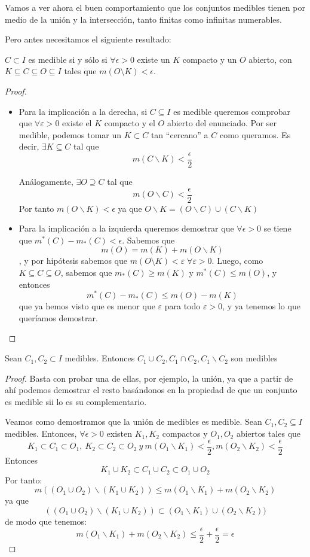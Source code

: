 \documentclass{apuntes}
\begin{document}
Vamos a ver ahora el buen comportamiento que los conjuntos medibles tienen por medio de la unión y la intersección, tanto finitas como infinitas numerables.

Pero antes necesitamos el siguiente resultado:
\begin{prop} $C \subset I$ es medible si y sólo si $\forall \epsilon > 0$ existe un $K$ compacto y un $O$ abierto, con $K⊆C⊆O⊆I$ tales que $m(O\setminus K) < \epsilon$.
\end{prop}

\begin{proof}
\begin{itemize}
\item Para la implicación a la derecha, si $C⊆I$ es medible queremos comprobar que $∀ε>0$ existe el $K$ compacto y el $O$ abierto del enunciado. Por ser medible, podemos tomar un $K \subset C$ tan ``cercano'' a $C$ como queramos. Es decir, $∃K⊆C$ tal que \[ m(C\smallsetminus K ) < \frac{\epsilon}{2}\]

Análogamente, $\exists O ⊇ C$ tal que \[ m(O\smallsetminus C ) < \frac{\epsilon}{2} \]
Por tanto $m(O\smallsetminus K) < \epsilon$ ya que $O \smallsetminus K = (O \smallsetminus C) \cup (C \smallsetminus K)$

\item Para la implicación a la izquierda queremos demostrar que $\forall \epsilon > 0$ se tiene que $m^*(C)-m_*(C) < \epsilon$. Sabemos que \[ m(O)=m(K) + m(O\smallsetminus K) \], y por hipótesis sabemos que $m(O\setminus K) < ε\; ∀ε>0$. Luego, como $K⊆C⊆O$, sabemos que $m_*(C) ≥ m(K)$ y $m^*(C) ≤ m(O)$, y entonces \[ m^*(C) - m_*(C) ≤ m(O) - m(K)\] que ya hemos visto que es menor que $ε$ para todo $ε>0$, y ya tenemos lo que queríamos demostrar.
\end{itemize}
\end{proof}

\begin{prop}
Sean $C_1, C_2 \subset I$ medibles. Entonces $C_1 \cup C_2, C_1 \cap C_2, C_1\smallsetminus C_2$  son medibles
\end{prop}
\begin{proof}
Basta con probar una de ellas, por ejemplo, la unión, ya que a partir de ahí podemos demostrar el resto basándonos en la propiedad de que un conjunto es medible sii lo es su complementario.

Veamos como demostramos que la unión de medibles es medible. Sean $C_1,C_2⊆I$ medibles. Entonces, $\forall \epsilon > 0$ existen $K_1, K_2$ compactos y $O_1, O_2$ abiertos tales que
\[K_1 \subset C_1 \subset O_1, \ K_2 \subset C_2 \subset O_2 \ y \ m(O_1 \smallsetminus K_1) < \frac{\epsilon}{2}, m(O_2 \smallsetminus K_2) < \frac{\epsilon}{2}\]
Entonces
\[K_1\cup K_2 \subset C_1 \cup C_2 \subset O_1\cup O_2\]
Por tanto:
\[m((O_1 \cup O_2)\smallsetminus (K_1 \cup K_2)) \leq m(O_1 \smallsetminus K_1) + m(O_2 \smallsetminus K_2) \]
ya que
\[((O_1 \cup O_2)\smallsetminus (K_1 \cup K_2)) \subset (O_1 \smallsetminus K_1)\cup (O_2 \smallsetminus K_2)) \]
de modo que tenemos:
\[m(O_1 \smallsetminus K_1) + m(O_2 \smallsetminus K_2) \leq \frac{\epsilon}{2} + \frac{\epsilon}{2} = \epsilon\]
\end{proof}
\end{document}

